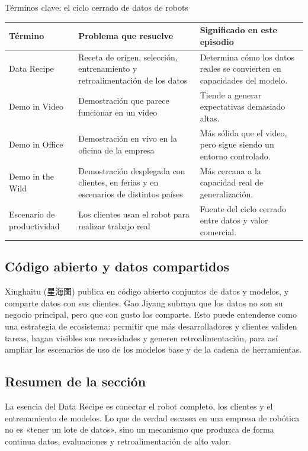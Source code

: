 \documentclass[a4paper]{article}
\begin{document}
\begin{knowledgebox}{Términos clave: el ciclo cerrado de datos de robots}
\begin{tabularx}{\textwidth}{p{}p{}X}
\toprule
Término & Problema que resuelve & Significado en este episodio \\
\midrule
Data Recipe & Receta de origen, selección, entrenamiento y retroalimentación de los datos & Determina cómo los datos reales se convierten en capacidades del modelo. \\
Demo in Video & Demostración que parece funcionar en un video & Tiende a generar expectativas demasiado altas. \\
Demo in Office & Demostración en vivo en la oficina de la empresa & Más sólida que el video, pero sigue siendo un entorno controlado. \\
Demo in the Wild & Demostración desplegada con clientes, en ferias y en escenarios de distintos países & Más cercana a la capacidad real de generalización. \\
Escenario de productividad & Los clientes usan el robot para realizar trabajo real & Fuente del ciclo cerrado entre datos y valor comercial. \\
\bottomrule
\end{tabularx}
\end{knowledgebox}

\subsection{Código abierto y datos compartidos}

Xinghaitu (星海图) publica en código abierto conjuntos de datos y modelos, y comparte datos con sus clientes. Gao Jiyang subraya que los datos no son su negocio principal, pero que con gusto los comparte. Esto puede entenderse como una estrategia de ecosistema: permitir que más desarrolladores y clientes validen tareas, hagan visibles sus necesidades y generen retroalimentación, para así ampliar los escenarios de uso de los modelos base y de la cadena de herramientas.

\subsection{Resumen de la sección}

La esencia del Data Recipe es conectar el robot completo, los clientes y el entrenamiento de modelos. Lo que de verdad escasea en una empresa de robótica no es «tener un lote de datos», sino un mecanismo que produzca de forma continua datos, evaluaciones y retroalimentación de alto valor.
\end{document}
